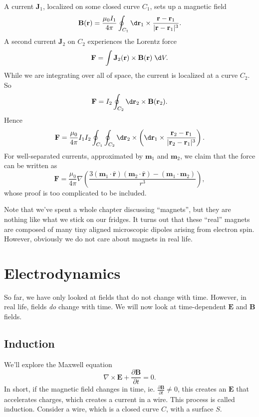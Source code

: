 \documentclass[a4paper]{article}
\begin{document}
\begin{eg}
  A current $\mathbf{J}_1$, localized on some closed curve $C_1$, sets up a magnetic field
  \[
    \mathbf{B}(\mathbf{r}) = \frac{\mu_0I_1}{4\pi}\oint_{C_1} \d \mathbf{r}_1 \times \frac{\mathbf{r} - \mathbf{r}_1}{|\mathbf{r} - \mathbf{r}_1|^3}.
  \]
  A second current $\mathbf{J}_2$ on $C_2$ experiences the Lorentz force
  \[
    \mathbf{F} = \int \mathbf{J}_2(\mathbf{r})\times \mathbf{B}(\mathbf{r})\;\d V.
  \]
  While we are integrating over all of space, the current is localized at a curve $C_2$. So
  \[
    \mathbf{F} = I_2\oint_{C_2} \d \mathbf{r}_2 \times \mathbf{B}(\mathbf{r}_2).
  \]
  Hence
  \[
    \mathbf{F} = \frac{\mu_0}{4\pi} I_1 I_2 \oint_{C_1}\oint_{C_2}\d \mathbf{r}_2\times \left(\d \mathbf{r}_1\times \frac{\mathbf{r}_2 - \mathbf{r}_1}{|\mathbf{r}_2 - \mathbf{r}_1|^3}\right).
  \]
  For well-separated currents, approximated by $\mathbf{m}_1$ and $\mathbf{m}_2$, we claim that the force can be written as
  \[
    \mathbf{F} = \frac{\mu_0}{4\pi}\nabla\left(\frac{3(\mathbf{m}_1\cdot \hat{\mathbf{r}})(\mathbf{m}_2\cdot \hat{\mathbf{r}}) - (\mathbf{m}_1\cdot \mathbf{m}_2)}{r^3}\right),
  \]
  whose proof is too complicated to be included.
\end{eg}

Note that we've spent a whole chapter discussing ``magnets'', but they are nothing like what we stick on our fridges. It turns out that these ``real'' magnets are composed of many tiny aligned microscopic dipoles arising from electron spin. However, obviously we do not care about magnets in real life.

\section{Electrodynamics}
So far, we have only looked at fields that do not change with time. However, in real life, fields \emph{do} change with time. We will now look at time-dependent $\mathbf{E}$ and $\mathbf{B}$ fields.
\subsection{Induction}
We'll explore the Maxwell equation
\[
  \nabla\times \mathbf{E} + \frac{\partial \mathbf{B}}{\partial t} = 0.
\]
In short, if the magnetic field changes in time, ie. $\frac{\partial \mathbf{B}}{\partial t} \not = 0$, this creates an $\mathbf{E}$ that accelerates charges, which creates a current in a wire. This process is called induction. Consider a wire, which is a closed curve $C$, with a surface $S$.
\end{document}
